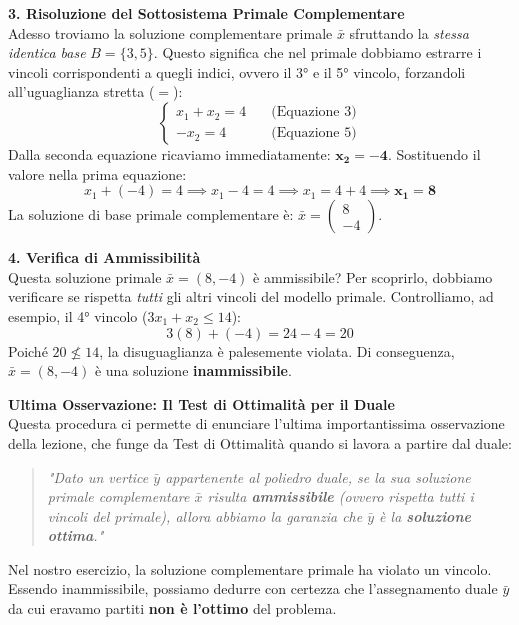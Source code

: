 \documentclass[12pt, a4paper]{article}
\begin{document}
	\vspace{0.3cm}
	\textbf{3. Risoluzione del Sottosistema Primale Complementare}\\
	Adesso troviamo la soluzione complementare primale $\bar{x}$ sfruttando la \textit{stessa identica base} $B = \{3, 5\}$. Questo significa che nel primale dobbiamo estrarre i vincoli corrispondenti a quegli indici, ovvero il 3° e il 5° vincolo, forzandoli all'uguaglianza stretta ($=$):
	\[
	\begin{cases}
		x_1 + x_2 = 4 \quad &\text{(Equazione 3)} \\
		-x_2 = 4 \quad &\text{(Equazione 5)}
	\end{cases}
	\]
	Dalla seconda equazione ricaviamo immediatamente: $\mathbf{x_2 = -4}$.
	Sostituendo il valore nella prima equazione:
	\[
	x_1 + (-4) = 4 \implies x_1 - 4 = 4 \implies x_1 = 4 + 4 \implies \mathbf{x_1 = 8}
	\]
	La soluzione di base primale complementare è: $\bar{x} = \begin{pmatrix} 8 \\ -4 \end{pmatrix}$.
	
	\vspace{0.4cm}
	\textbf{4. Verifica di Ammissibilità}\\
	Questa soluzione primale $\bar{x} = (8, -4)$ è ammissibile? Per scoprirlo, dobbiamo verificare se rispetta \textit{tutti} gli altri vincoli del modello primale. Controlliamo, ad esempio, il 4° vincolo ($3x_1 + x_2 \leq 14$):
	\[
	3(8) + (-4) = 24 - 4 = 20
	\]
	Poiché $20 \not\leq 14$, la disuguaglianza è palesemente violata. Di conseguenza, $\bar{x} = (8, -4)$ è una soluzione \textbf{inammissibile}.
	
	\vspace{0.4cm}
	\textbf{Ultima Osservazione: Il Test di Ottimalità per il Duale}\\
	Questa procedura ci permette di enunciare l'ultima importantissima osservazione della lezione, che funge da Test di Ottimalità quando si lavora a partire dal duale:
	\begin{quote}
		\textit{"Dato un vertice $\bar{y}$ appartenente al poliedro duale, se la sua soluzione primale complementare $\bar{x}$ risulta \textbf{ammissibile} (ovvero rispetta tutti i vincoli del primale), allora abbiamo la garanzia che $\bar{y}$ è la \textbf{soluzione ottima}."}
	\end{quote}
	Nel nostro esercizio, la soluzione complementare primale ha violato un vincolo. Essendo inammissibile, possiamo dedurre con certezza che l'assegnamento duale $\bar{y}$ da cui eravamo partiti \textbf{non è l'ottimo} del problema.
	
\end{document}
